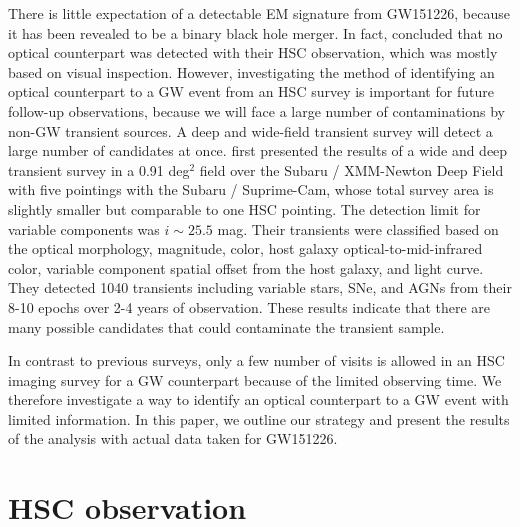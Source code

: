 \documentclass[]{pasj01}
\begin{document}
There is little expectation of a detectable EM signature from GW151226, because it  has been revealed to be a binary black hole merger.
In fact, \citet{2017PASJ...69....9Y} concluded that no optical counterpart was detected with their HSC observation,
which was mostly based on visual inspection.
However, investigating the method of identifying an optical counterpart to a GW event from an HSC survey is important
for future follow-up observations, because we will face a large number of contaminations by non-GW transient sources.
A deep and wide-field transient survey will detect a large number of candidates at once.
\citet{2008ApJ...676..163M} first presented the results of a wide and deep transient survey in a 0.91 deg$^2$ field over the Subaru / XMM-Newton Deep Field \citep[SXDF;][]{2008ApJS..176....1F}
with five pointings with the Subaru / Suprime-Cam, whose total survey area is slightly smaller but comparable to one HSC pointing.
The detection limit for variable components was $i\sim25.5$ mag.
Their transients were classified based on the optical morphology, magnitude, color, host galaxy optical-to-mid-infrared color,
variable component spatial offset from the host galaxy, and light curve.
They detected 1040 transients including variable stars, SNe, and AGNs from their 8-10 epochs over 2-4 years of observation.
These results indicate that there are many possible
candidates that could contaminate the transient sample.


In contrast to previous surveys,  only a few number of visits is allowed in an HSC imaging survey for a GW counterpart because of the limited observing time.
We therefore investigate a way to identify an optical counterpart to a GW event with limited information.
In this paper, we outline our strategy and present the results of the analysis with actual data taken for GW151226.

\section{HSC observation}\label{selection}
\end{document}
